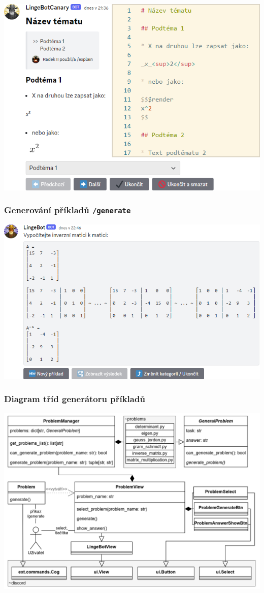 \documentclass[FM]{tulpresentation}
\begin{document}
	\begin{frame}[plain]
		\includegraphics[width=.95\paperwidth]{img/idk4}
	\end{frame}
	
	\begin{frame}\frametitle{Generování příkladů \texttt{/generate}}
		\includegraphics[width=.95\paperwidth]{img/idk5}
	\end{frame}
	
	\begin{frame}[plain]\frametitle{Diagram tříd generátoru příkladů}
		\includegraphics[width=.95\paperwidth]{img/idk6}
	\end{frame}
	
\end{document}
